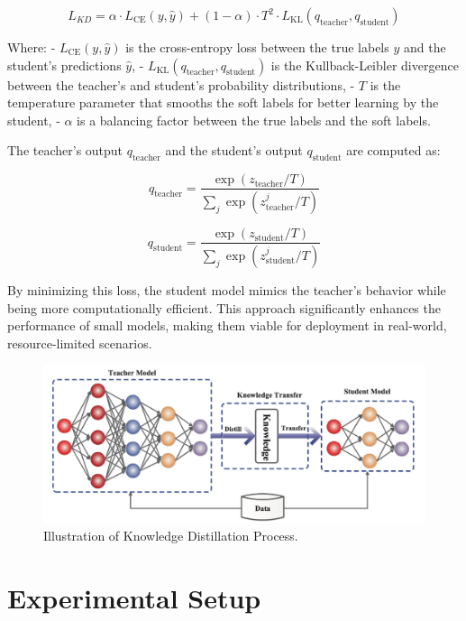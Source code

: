 \documentclass[conference,letterpaper]{IEEEtran}
\begin{document}
\[
L_{KD} = \alpha \cdot L_{\text{CE}}(y, \hat{y}) + (1 - \alpha) \cdot T^2 \cdot L_{\text{KL}}(q_{\text{teacher}}, q_{\text{student}})
\]

Where:
- \( L_{\text{CE}}(y, \hat{y}) \) is the cross-entropy loss between the true labels \( y \) and the student’s predictions \( \hat{y} \),
- \( L_{\text{KL}}(q_{\text{teacher}}, q_{\text{student}}) \) is the Kullback-Leibler divergence between the teacher’s and student’s probability distributions,
- \( T \) is the temperature parameter that smooths the soft labels for better learning by the student,
- \( \alpha \) is a balancing factor between the true labels and the soft labels.

The teacher’s output \( q_{\text{teacher}} \) and the student’s output \( q_{\text{student}} \) are computed as:

\[
q_{\text{teacher}} = \frac{\exp(z_{\text{teacher}} / T)}{\sum_j \exp(z_{\text{teacher}}^j / T)}
\]

\[
q_{\text{student}} = \frac{\exp(z_{\text{student}} / T)}{\sum_j \exp(z_{\text{student}}^j / T)}
\]

By minimizing this loss, the student model mimics the teacher’s behavior while being more computationally efficient. This approach significantly enhances the performance of small models, making them viable for deployment in real-world, resource-limited scenarios.

\begin{figure}[h]
    \centering
    \includegraphics[width=\linewidth]{knowledge distillation .png} %
    \caption{Illustration of Knowledge Distillation Process.} %
    \label{fig:knowledge-distillation}
\end{figure}

\section{Experimental Setup}
\end{document}
